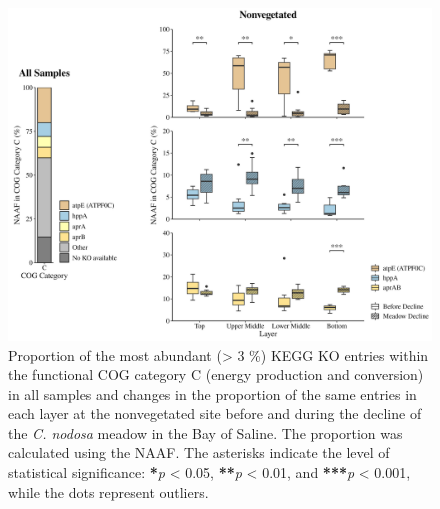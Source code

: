 \documentclass[
  12 pt,
]{article}
\begin{document}
\begin{figure}[H]

{\centering \includegraphics[width=1\linewidth]{../results/figures/cog_c_kegg} 

}

\caption{Proportion of the most abundant (\textgreater{} 3 \si{\percent}) KEGG KO entries within the functional COG category C (energy production and conversion) in all samples and changes in the proportion of the same entries in each layer at the nonvegetated site before and during the decline of the \emph{C. nodosa} meadow in the Bay of Saline. The proportion was calculated using the NAAF. The asterisks indicate the level of statistical significance: \textbf{*}\emph{p} \textless{} 0.05, \textbf{**}\emph{p} \textless{} 0.01, and \textbf{***}\emph{p} \textless{} 0.001, while the dots represent outliers.}\label{fig:cog-c-kegg}
\end{figure}
\end{document}
